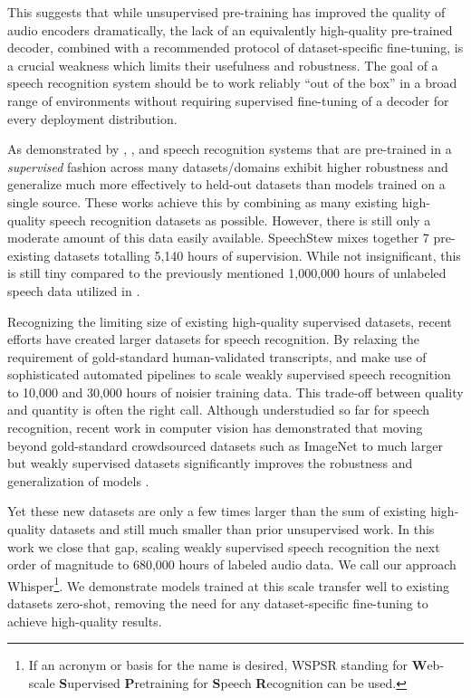 \documentclass[nohyperref]{article}
\theoremstyle{plain}
\theoremstyle{definition}
\theoremstyle{remark}
\begin{document}
This suggests that while unsupervised pre-training has improved the quality of audio encoders dramatically, the lack of an equivalently high-quality pre-trained decoder, combined with a recommended protocol of dataset-specific fine-tuning, is a crucial weakness which limits their usefulness and robustness. The goal of a speech recognition system should be to work reliably ``out of the box'' in a broad range of environments without requiring supervised fine-tuning of a decoder for every deployment distribution.

As demonstrated by \citet{narayanan2018toward}, \citet{likhomanenko2020rethinking}, and \citet{chan2021speechstew} speech recognition systems that are pre-trained in a \textit{supervised} fashion across many datasets/domains exhibit higher robustness and generalize much more effectively to held-out datasets than models trained on a single source. These works achieve this by combining as many existing high-quality speech recognition datasets as possible. However, there is still only a moderate amount of this data easily available. SpeechStew \cite{chan2021speechstew} mixes together 7 pre-existing datasets totalling 5,140 hours of supervision. While not insignificant, this is still tiny compared to the previously mentioned 1,000,000 hours of unlabeled speech data utilized in \citet{zhang2021bigssl}.

Recognizing the limiting size of existing high-quality supervised datasets, recent efforts have created larger datasets for speech recognition. By relaxing the requirement of gold-standard human-validated transcripts, \citet{chen2021gigaspeech} and \citet{galvez2021people} make use of sophisticated automated pipelines to scale weakly supervised speech recognition to 10,000 and 30,000 hours of noisier training data. This trade-off between quality and quantity is often the right call. Although understudied so far for speech recognition, recent work in computer vision has demonstrated that moving beyond gold-standard crowdsourced datasets such as ImageNet \cite{russakovsky2015imagenet} to much larger but weakly supervised datasets significantly improves the robustness and generalization of models \cite{mahajan2018exploring,kolesnikov2020big}.

Yet these new datasets are only a few times larger than the sum of existing high-quality datasets and still much smaller than prior unsupervised work. In this work we close that gap, scaling weakly supervised speech recognition the next order of magnitude to 680,000 hours of labeled audio data. We call our approach Whisper\footnote{If an acronym or basis for the name is desired, WSPSR standing for \textbf{W}eb-scale \textbf{S}upervised \textbf{P}retraining for \textbf{S}peech \textbf{R}ecognition can be used.}. We demonstrate models trained at this scale transfer well to existing datasets zero-shot, removing the need for any dataset-specific fine-tuning to achieve high-quality results.
\end{document}
